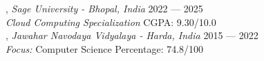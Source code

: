, \textit{Sage University - Bhopal, India} \hfill 2022 --- 2025 \\
\textit{Cloud Computing Specialization} \hfill CGPA: 9.30/10.0 \\

, \textit{Jawahar Navodaya Vidyalaya - Harda, India} \hfill 2015 --- 2022 \\
\textit{Focus:} Computer Science \hfill Percentage: 74.8/100

